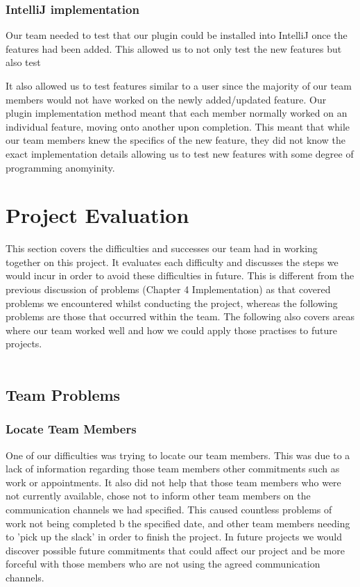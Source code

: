 \subsubsection{IntelliJ implementation}
Our team needed to test that our plugin could be installed into IntelliJ once the features had been added. This allowed us to not only test the new features but also test


It also allowed us to test features similar to a user since the majority of our team members would not have worked on the newly added/updated feature. Our plugin implementation method meant that each member normally worked on an individual feature, moving onto another upon completion. This meant that while our team members knew the specifics of the new feature, they did not know the exact implementation details allowing us to test new features with some degree of programming anomyinity. 
\section{Project Evaluation}
This section covers the difficulties and successes our team had in working together on this project. It evaluates each difficulty and discusses the steps we would incur in order to avoid these difficulties in future. This is different from the previous discussion of problems (Chapter 4 Implementation) as that covered problems we encountered whilst conducting the project, whereas the following problems are those that occurred within the team. The following also covers areas where our team worked well and how we could apply those practises to future projects.  \\
\\
\subsection{Team Problems}

\subsubsection{Locate Team Members}
One of our difficulties was trying to locate our team members. This was due to a lack of information regarding those team members other commitments such as work or appointments. It also did not help that those team members who were not currently available, chose not to inform other team members on the communication channels we had specified. This caused countless problems of work not being completed b the specified date, and other team members needing to 'pick up the slack' in order to finish the project. In future projects we would discover possible future commitments that could affect our project and be more forceful with those members who are not using the agreed communication channels.\\
\\
